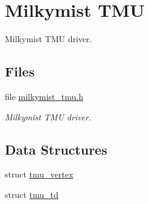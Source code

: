 \hypertarget{group__lm32__milkymist__tmu}{}\section{Milkymist T\+MU}
\label{group__lm32__milkymist__tmu}


Milkymist T\+MU driver.  


\subsection*{Files}
\begin{DoxyCompactItemize}
\item 
file \mbox{\hyperlink{milkymist__tmu_8h}{milkymist\+\_\+tmu.\+h}}
\begin{DoxyCompactList}\small\item\em Milkymist T\+MU driver. \end{DoxyCompactList}\end{DoxyCompactItemize}
\subsection*{Data Structures}
\begin{DoxyCompactItemize}
\item 
struct \mbox{\hyperlink{structtmu__vertex}{tmu\+\_\+vertex}}
\item 
struct \mbox{\hyperlink{structtmu__td}{tmu\+\_\+td}}
\end{DoxyCompactItemize}
